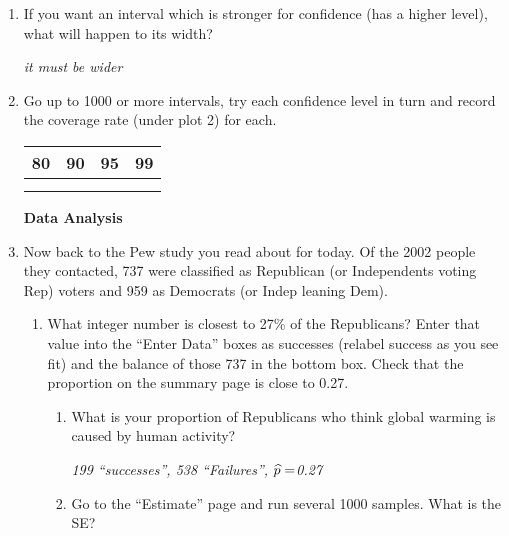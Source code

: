 \begin{enumerate}
\item If you want an interval which is stronger for confidence
  (has a higher level), what will happen to its width?
\begin{students}
  \vspace{.6cm}
\end{students}
\begin{key}
  {\it it must be wider}
\end{key}

  \item Go up to 1000 or more intervals, try each confidence level in
    turn and record the coverage rate   (under plot 2) for each.\\
    \begin{tabular}{|r|r|r|r|} \hline
      {\Large 80} &  {\Large 90} &  {\Large 95} &  {\Large 99}\\ \hline
   {\large  \phantom{9000} } & {\Large \phantom{9000}  } &  {\Large
     \phantom{9000} } &  {\Large  \phantom{9000} } \\
       & & & \\ \hline
    \end{tabular}


    \begin{center}
      {\large\bf Data Analysis}
    \end{center}
  \item Now back to the Pew study you read about for today. Of the 2002 people
    they contacted, 737 were classified as Republican (or Independents
    voting Rep) voters and 959 as Democrats (or Indep leaning Dem).
    \begin{enumerate}
    \item What integer number is closest to 27\% of the Republicans?
      Enter that value into the  ``Enter Data'' boxes
      as successes (relabel success as you see fit)  and the balance
      of those 737 in the bottom box. Check that the proportion on the
      summary page is  close to 0.27. 
      \begin{enumerate}
      \item What is your proportion of Republicans who think global
        warming is caused by human activity?
\begin{students}
\vspace{.8cm}
\end{students}

\begin{key}
  {\em 199 ``successes'', 538 ``Failures'', $\widehat{p} = $0.27}
\end{key}
      \item Go to the ``Estimate'' page and run several 1000
        samples. What is the SE?
\begin{students}
\vspace{.8cm}
\end{students}


\end{enumerate}
\end{enumerate}
\end{enumerate}
